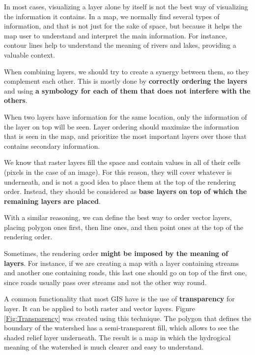 In most cases, visualizing a layer alone by itself is not the best way of visualizing the information it contains. In a map, we normally find several types of information, and that is not just for the sake of space, but because it helps the map user to understand and interpret the main information. For instance, contour lines help to understand the meaning of rivers and lakes, providing a valuable context.

When combining layers, we should try to create a synergy between them, so they complement each other. This is mostly done by \textbf{correctly ordering the layers} and using \textbf{a symbology for each of them that does not interfere with the others}.

When two layers have information for the same location, only the information of the layer on top will be seen. Layer ordering should maximize the information that is seen in the map, and prioritize the most important layers over those that contains secondary information.

We know that raster layers fill the space and contain values in all of their cells (pixels in the case of an image). For this reason, they will cover whatever is underneath, and is not a good idea to place them at the top of the rendering order. Instead, they should be considered as \textbf{base layers on top of which the remaining layers are placed}.

With a similar reasoning, we can define the best way to order vector layers, placing polygon ones first, then line ones, and then point ones at the top of the rendering order.

Sometimes, the rendering order \textbf{might be imposed by the meaning of layers}. For instance, if we are creating a map with a layer containing streams and another one containing roads, this last one should go on top of the first one, since roads usually pass over streams and not the other way round.

A common functionality that most GIS have is the use of \textbf{transparency} for layer. It can be applied to both raster and vector layers. Figure \ref{Fig:Transparency} was created using this technique. The polygon that defines the boundary of the watershed has a semi-transparent fill, which allows to see the shaded relief layer underneath. The result is a map in which the hydrogical meaning of the watershed is much clearer and easy to understand.

